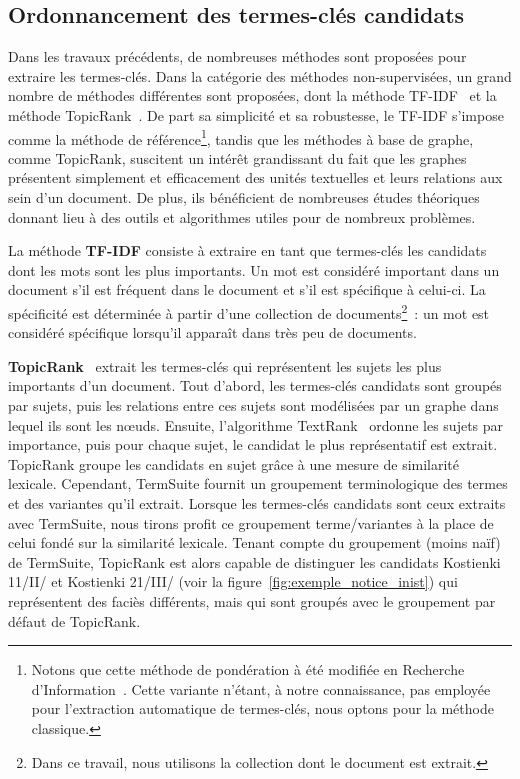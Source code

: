   \subsection{Ordonnancement des termes-clés candidats}
  \label{subsec:extraction_de_termes_cles}
    Dans les travaux précédents, de nombreuses méthodes sont proposées pour
    extraire les termes-clés. Dans la catégorie des méthodes non-supervisées, un
    grand nombre de méthodes différentes sont proposées, dont la méthode
    TF-IDF~\cite{jones1972tfidf} et la méthode
    TopicRank~\cite{bougouin2013topicrank}. De part sa simplicité et sa
    robustesse, le TF-IDF s'impose comme la méthode de référence\footnote{Notons
    que cette méthode de pondération à été modifiée en Recherche
    d'Information~\cite[Okapi]{robertson1999okapi,claveau2012vectorisation}.
    Cette variante n'étant, à notre connaissance, pas employée pour l'extraction
    automatique de termes-clés, nous optons pour la méthode classique.}, tandis
    que les méthodes à base de graphe, comme TopicRank, suscitent un intérêt
    grandissant du fait que les graphes présentent simplement et efficacement
    des unités textuelles et leurs relations aux sein d'un document. De plus,
    ils bénéficient de nombreuses études théoriques donnant lieu à des outils et
    algorithmes utiles pour de nombreux problèmes.

    La méthode \textbf{TF-IDF} consiste à extraire en tant que termes-clés les
    candidats dont les mots sont les plus importants. Un mot est considéré
    important dans un document s'il est fréquent dans le document et s'il est
    spécifique à celui-ci. La spécificité est déterminée à partir d'une
    collection de documents\footnote{Dans ce travail, nous utilisons la
    collection dont le document est extrait.}~: un mot est considéré spécifique
    lorsqu'il apparaît dans très peu de documents.

    \textbf{TopicRank}~\cite{bougouin2013topicrank} extrait les termes-clés qui
    représentent les sujets les plus importants d'un document. Tout d'abord, les
    termes-clés candidats sont groupés par sujets, puis les relations entre ces
    sujets sont modélisées par un graphe dans lequel ils sont les n\oe{}uds.
    Ensuite, l'algorithme TextRank~\cite{mihalcea2004textrank} ordonne les
    sujets par importance, puis pour chaque sujet, le candidat le plus
    représentatif est extrait. TopicRank groupe les candidats en sujet grâce à
    une mesure de similarité lexicale. Cependant, TermSuite fournit un
    groupement terminologique des termes et des variantes qu'il extrait. Lorsque
    les termes-clés candidats sont ceux extraits avec TermSuite, nous tirons
    profit ce groupement terme/variantes à la place de celui fondé sur la
    similarité lexicale. Tenant compte du groupement (moins naïf) de TermSuite,
    TopicRank est alors capable de distinguer les candidats \og{}Kostienki
    11/II/\fg{} et \og{}Kostienki 21/III/\fg{} (voir la
    figure~\ref{fig:exemple_notice_inist}) qui représentent des faciès
    différents, mais qui sont groupés avec le groupement par défaut de
    TopicRank.

